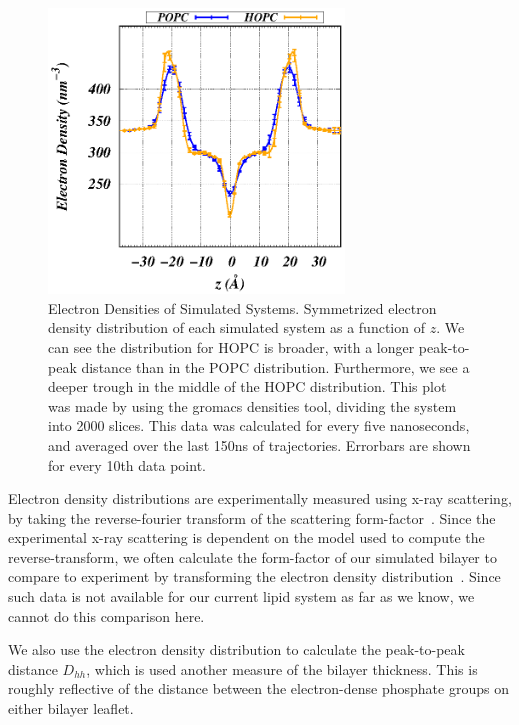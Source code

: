 \documentclass[12pt,openany,final]{book}
\begin{document}
\begin{figure}[p]
    \caption[Electron Densities of Simulated Systems.]{ 
Electron Densities of Simulated Systems. Symmetrized electron density distribution of each simulated system as a 
function of $z$. We can see the distribution for HOPC 
is broader, with a longer peak-to-peak distance than in the POPC distribution. Furthermore, 
we see a deeper trough in the middle of the HOPC distribution. This plot was made by using the gromacs densities tool, 
dividing the system into 2000 slices. This data was calculated for every five 
nanoseconds, and averaged over the last 150ns of trajectories. Errorbars are shown for every 10th data point.
}
\label{fig:eledens}
\includegraphics[width=	0.7\textwidth]{ele_scattering_density.eps}
\end{figure}
Electron density distributions are experimentally measured using x-ray scattering, by taking the reverse-fourier transform of
the scattering form-factor~\cite{fogarty:2015,nagle:2000,pandit:2008:simulationtextbook}. Since the experimental x-ray scattering is dependent on the model used to
compute the reverse-transform, we often calculate the form-factor of our simulated bilayer to compare to experiment by transforming the
electron density distribution~\cite{chiu:2009,kruczek:2017:ether,kruczek:2017}.
Since such data is not available for our current lipid system as far as we know, we cannot do this comparison here. 

We also use the electron density distribution to calculate the peak-to-peak distance $D_{hh}$, 
which is used another measure of the bilayer thickness. This is roughly reflective of the distance between the 
electron-dense phosphate groups on either bilayer leaflet.
\end{document}
